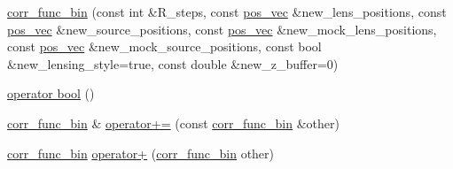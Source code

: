 \begin{DoxyCompactItemize}
\item 
\hyperlink{structcorr__func__bin_ac4625f1ff7e13e360836611e64a8f22a}{corr\+\_\+func\+\_\+bin} (const int \&R\+\_\+steps, const \hyperlink{structcorr__func__bin_a683c7075740b3dcae9ebb1ac758c0bfa}{pos\+\_\+vec} \&new\+\_\+lens\+\_\+positions, const \hyperlink{structcorr__func__bin_a683c7075740b3dcae9ebb1ac758c0bfa}{pos\+\_\+vec} \&new\+\_\+source\+\_\+positions, const \hyperlink{structcorr__func__bin_a683c7075740b3dcae9ebb1ac758c0bfa}{pos\+\_\+vec} \&new\+\_\+mock\+\_\+lens\+\_\+positions, const \hyperlink{structcorr__func__bin_a683c7075740b3dcae9ebb1ac758c0bfa}{pos\+\_\+vec} \&new\+\_\+mock\+\_\+source\+\_\+positions, const bool \&new\+\_\+lensing\+\_\+style=true, const double \&new\+\_\+z\+\_\+buffer=0)
\item 
\hyperlink{structcorr__func__bin_abe404510805b11498212bd1268daa2ed}{operator bool} ()
\item 
\hyperlink{structcorr__func__bin}{corr\+\_\+func\+\_\+bin} \& \hyperlink{structcorr__func__bin_a9f617c1efaa70492e2abffcf940b6353}{operator+=} (const \hyperlink{structcorr__func__bin}{corr\+\_\+func\+\_\+bin} \&other)
\item 
\hyperlink{structcorr__func__bin}{corr\+\_\+func\+\_\+bin} \hyperlink{structcorr__func__bin_a6684a7372d074c139864d2c0891f769e}{operator+} (\hyperlink{structcorr__func__bin}{corr\+\_\+func\+\_\+bin} other)
\end{DoxyCompactItemize}
